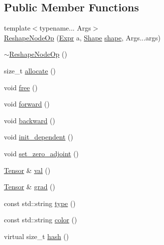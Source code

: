\subsection*{Public Member Functions}
\begin{DoxyCompactItemize}
\item 
{\footnotesize template$<$typename... Args$>$ }\\\hyperlink{classmarian_1_1ReshapeNodeOp_a5e7f049300ccff3d578f3e4c67b258f1}{Reshape\+Node\+Op} (\hyperlink{namespacemarian_a498d8baf75b754011078b890b39c8e12}{Expr} a, \hyperlink{structmarian_1_1Shape}{Shape} \hyperlink{classmarian_1_1Node_aa631f0244ad94b4c64efab0f140bd1d5}{shape}, Args...\+args)
\item 
\hyperlink{classmarian_1_1ReshapeNodeOp_ae314c869db74529cd4b114e2a677b891}{$\sim$\+Reshape\+Node\+Op} ()
\item 
size\+\_\+t \hyperlink{classmarian_1_1ReshapeNodeOp_a243a36a9cd6424ebefb74d025309f560}{allocate} ()
\item 
void \hyperlink{classmarian_1_1ReshapeNodeOp_a91830ea5e627891025195ded73877bcb}{free} ()
\item 
void \hyperlink{classmarian_1_1ReshapeNodeOp_a8f9ca94013f3465349e43d3c2353b6ac}{forward} ()
\item 
void \hyperlink{classmarian_1_1ReshapeNodeOp_ac9699ea9bb2347584e26d9b4e7460a81}{backward} ()
\item 
void \hyperlink{classmarian_1_1ReshapeNodeOp_a989d96bc6466ecb0bc3fc46b9cc8674d}{init\+\_\+dependent} ()
\item 
void \hyperlink{classmarian_1_1ReshapeNodeOp_a201cb6e0e0095a314b3cb72b38bc5a1d}{set\+\_\+zero\+\_\+adjoint} ()
\item 
\hyperlink{namespacemarian_a88b71ec34bb354564cddc24eb80f7e14}{Tensor} \& \hyperlink{classmarian_1_1ReshapeNodeOp_a61262825805f0d2ab311d7ad36fed515}{val} ()
\item 
\hyperlink{namespacemarian_a88b71ec34bb354564cddc24eb80f7e14}{Tensor} \& \hyperlink{classmarian_1_1ReshapeNodeOp_a74f6cd342abd616d2b8f8a89948e45ea}{grad} ()
\item 
const std\+::string \hyperlink{classmarian_1_1ReshapeNodeOp_a55763fba7127dae91e3cc878f5617edd}{type} ()
\item 
const std\+::string \hyperlink{classmarian_1_1ReshapeNodeOp_af2273386eb99822cd20bce1b9e877f49}{color} ()
\item 
virtual size\+\_\+t \hyperlink{classmarian_1_1ReshapeNodeOp_a629e7d06a0a137b9b6dd9343619ac860}{hash} ()
\end{DoxyCompactItemize}
